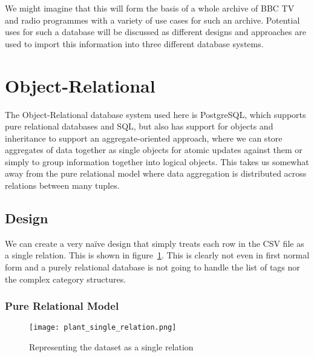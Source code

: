 \documentclass[11pt,a4paper]{article}
\begin{document}
We might imagine that this will form the basis of a whole archive of BBC
TV and radio programmes with a variety of use cases for such an archive.
Potential uses for such a database will be discussed as different designs
and approaches are used to import this information into three different
database systems.

\section{Object-Relational}
\label{sec:postgres}

The Object-Relational database system used here is PostgreSQL, which supports
pure relational databases and SQL, but also has support for objects and
inheritance to support an aggregate-oriented approach, where we can store
aggregates of data together as single objects for atomic updates against
them or simply to group information together into logical objects. This
takes us somewhat away from the pure relational model where data aggregation
is distributed across relations between many tuples. \cite{sadalage2012nosql}

\subsection{Design}

We can create a very na\"ive design that simply treats each row in the
CSV file as a single relation. This is shown in figure~\ref{fig:single-relation}.
This is clearly not even in first normal form \cite{codd1972further}
and a purely relational database
is not going to handle the list of tags nor the complex category structures.

\subsubsection{Pure Relational Model}

\begin{comment}
  @startuml plant_single_relation.png
  class Programme {
    pid
    start_time
    end_time
    epoch_start
    epoch_end
    complete_title
    media_type
    masterbrand
    service
    brand_pid
    is_clip
    categories
    tags
  }
  @enduml
\end{comment}
\begin{figure}[p]
  \begin{center}
    \texttt{[image: plant\_single\_relation.png]}
  \end{center}
  \caption{Representing the dataset as a single relation}
  \label{fig:single-relation}
\end{figure}
\end{document}

